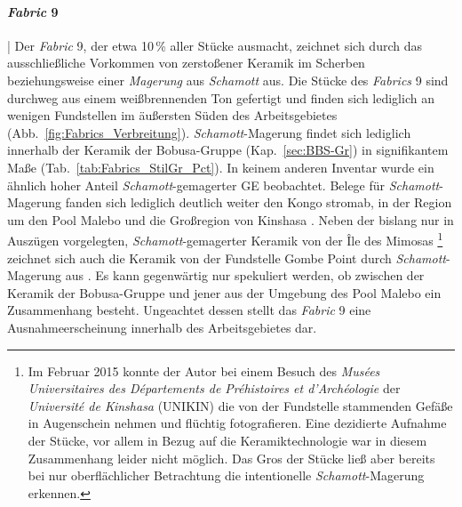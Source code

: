 \begin{multicols}{2}
\paragraph{\textit{Fabric} 9}\hspace{-.5em}|\hspace{.5em}%
Der \textit{Fabric} 9, der etwa 10\,\% aller Stücke ausmacht, zeichnet sich durch das ausschließliche Vorkommen von zerstoßener Keramik im Scherben beziehungsweise einer \textit{Magerung} aus \textit{Schamott} aus. Die Stücke des \textit{Fabrics} 9 sind durchweg aus einem weißbrennenden Ton gefertigt und finden sich lediglich an wenigen Fundstellen im äußersten Süden des Arbeitsgebietes (Abb.~\ref{fig:Fabrics_Verbreitung}). \textit{Schamott}-Magerung findet sich lediglich innerhalb der Keramik der Bobusa-Gruppe (Kap.~\ref{sec:BBS-Gr}) in signifikantem Maße (Tab.~\ref{tab:Fabrics_StilGr_Pct}). In keinem anderen Inventar wurde ein ähnlich hoher Anteil \textit{Schamott}-gemagerter GE beobachtet. Belege für \textit{Schamott}-Magerung fanden sich lediglich deutlich weiter den Kongo stromab, in der Region um den Pool Malebo und die Großregion von Kinshasa \parencite[17--22, 152]{Gosselain.1988}. Neben der bislang nur in Auszügen vorgelegten, \textit{Schamott}-gemagerter Keramik von der Île des Mimosas \parencite[279\,f.]{Eggert.1984}\footnote{Im Februar 2015 konnte der Autor bei einem Besuch des \textit{Musées Universitaires des Départements de Préhistoires et d'Archéologie} der \textit{Université de Kinshasa} (UNIKIN) die von der Fundstelle stammenden Gefäße in Augenschein nehmen und flüchtig fotografieren. Eine dezidierte Aufnahme der Stücke, vor allem in Bezug auf die Keramiktechnologie war in diesem Zusammenhang leider nicht möglich. Das Gros der Stücke ließ aber bereits bei nur oberflächlicher Betrachtung die intentionelle \textit{Schamott}-Magerung erkennen.\label{ftn:IleMimosas}} zeichnet sich auch die Keramik von der Fundstelle Gombe Point durch \textit{Schamott}-Magerung aus \parencite[586]{Cahen.1976}. Es kann gegenwärtig nur spekuliert werden, ob zwischen der Keramik der Bobusa-Gruppe und jener aus der Umgebung des Pool Malebo ein Zusammenhang besteht. Ungeachtet dessen stellt das \textit{Fabric} 9 eine Ausnahmeerscheinung innerhalb des Arbeitsgebietes dar. 


\end{multicols}
